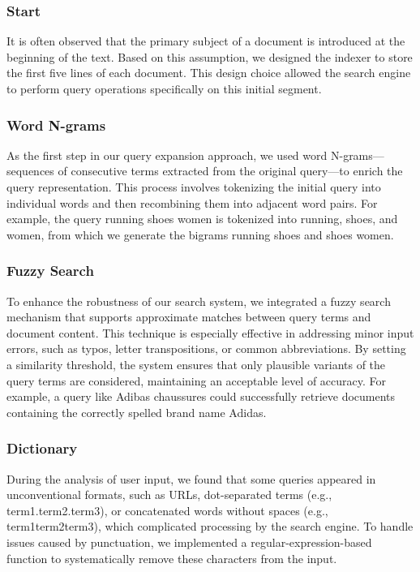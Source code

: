 \subsubsection{Start}
\label{subsubsec:Start}
It is often observed that the primary subject of a document is introduced at the beginning of the text. Based on this assumption, we designed the indexer to store the first five lines of each document. This design choice allowed the search engine to perform query operations specifically on this initial segment.

\subsubsection{Word N-grams}
\label{subsubsec:N-grams}
As the first step in our query expansion approach, we used word N-grams—sequences of consecutive terms extracted from the original query—to enrich the query representation. This process involves tokenizing the initial query into individual words and then recombining them into adjacent word pairs. For example, the query running shoes women is tokenized into running, shoes, and women, from which we generate the bigrams running shoes and shoes women.


\subsubsection{Fuzzy Search}
\label{subsubsec:fuzzy}
To enhance the robustness of our search system, we integrated a fuzzy search mechanism that supports approximate matches between query terms and document content. This technique is especially effective in addressing minor input errors, such as typos, letter transpositions, or common abbreviations. By setting a similarity threshold, the system ensures that only plausible variants of the query terms are considered, maintaining an acceptable level of accuracy. For example, a query like Adibas chaussures could successfully retrieve documents containing the correctly spelled brand name Adidas.

\subsubsection{Dictionary}
\label{subsubsec:Dictionary}
During the analysis of user input, we found that some queries appeared in unconventional formats, such as URLs, dot-separated terms (e.g., term1.term2.term3), or concatenated words without spaces (e.g., term1term2term3), which complicated processing by the search engine. To handle issues caused by punctuation, we implemented a regular-expression-based function to systematically remove these characters from the input.

